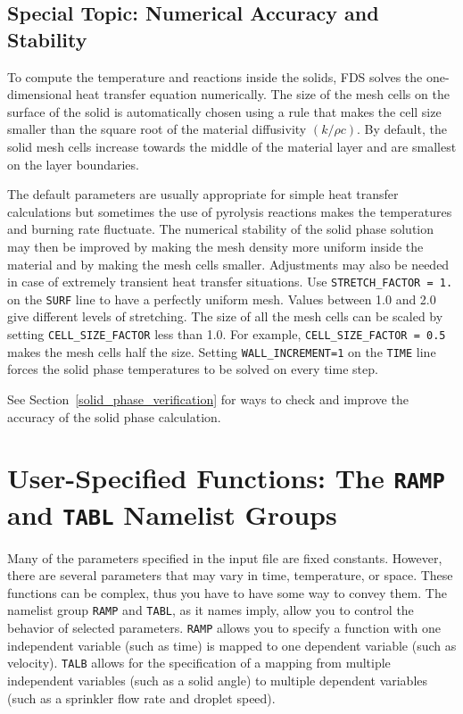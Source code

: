 \documentclass[11pt]{book}
\newcommand{\ct}{\tt\small}
\begin{document}
\subsection{Special Topic: Numerical Accuracy and Stability}

To compute the temperature and reactions inside the solids, FDS solves
the one-dimensional heat transfer equation numerically. The size of
the mesh cells on the surface of the solid is automatically chosen
using a rule that makes the cell size smaller than the square root of
the material diffusivity $(k/\rho c)$. By default, the solid mesh
cells increase towards the middle of the material layer and are smallest
on the layer boundaries.

The default parameters are usually appropriate for simple heat
transfer calculations but sometimes the use of pyrolysis reactions
makes the temperatures and burning rate fluctuate. The numerical
stability of the solid phase solution may then be improved by making
the mesh density more uniform inside the material and by making the
mesh cells smaller. Adjustments may also be needed in case of
extremely transient heat transfer situations. Use {\ct STRETCH\_FACTOR
= 1.} on the {\ct SURF} line to have a perfectly uniform mesh. Values
between 1.0 and 2.0 give different levels of stretching.  The size of
all the mesh cells can be scaled by setting {\ct CELL\_SIZE\_FACTOR}
less than 1.0. For example, {\ct CELL\_SIZE\_FACTOR = 0.5} makes the
mesh cells half the size. Setting {\ct WALL\_INCREMENT=1} on the
{\ct TIME} line forces the solid phase temperatures to be solved on every
time step.

See Section~\ref{solid_phase_verification} for ways to check and improve the accuracy of the solid phase calculation.






\clearpage

\section{User-Specified Functions: The \texorpdfstring{{\tt RAMP}}{RAMP} and \texorpdfstring{{\tt TABL}}{TABL} Namelist Groups}
\label{info:RAMP}
\label{info:TABL}

Many of the parameters specified in the input file are fixed constants. However, there are several parameters that may vary in
time, temperature, or space. These functions can be complex, thus you have to have some way to convey them. The namelist group
{\ct RAMP} and {\ct TABL}, as it names imply, allow you to control the behavior of selected parameters.  {\ct RAMP} allows you
to specify a function with one independent variable (such as time) is mapped to one dependent variable (such as velocity).
{\ct TALB} allows for the specification of a mapping from multiple independent variables (such as a solid angle) to multiple
dependent variables (such as a sprinkler flow rate and droplet speed).
\end{document}
